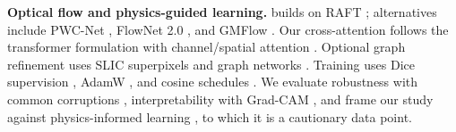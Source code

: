 \textbf{Optical flow and physics-guided learning.} \ofcv{} builds on RAFT
\cite{teed2020raft}; alternatives include PWC-Net \cite{sun2018pwcnet}, FlowNet
2.0 \cite{ilg2017flownet2}, and GMFlow \cite{xu2022gmflow}. Our cross-attention
follows the transformer formulation \cite{vaswani2017transformer} with
channel/spatial attention \cite{woo2018cbam,hu2018senet}. Optional graph
refinement uses SLIC superpixels \cite{achanta2012slic} and graph networks
\cite{kipf2017gcn,xu2019gin}. Training uses Dice supervision
\cite{milletari2016vnet}, AdamW \cite{loshchilov2019adamw}, and cosine schedules
\cite{loshchilov2017sgdr}. We evaluate robustness with common corruptions
\cite{hendrycks2019robustness}, interpretability with Grad-CAM
\cite{selvaraju2017gradcam}, and frame our study against physics-informed
learning \cite{karniadakis2021piml}, to which it is a cautionary data point.

